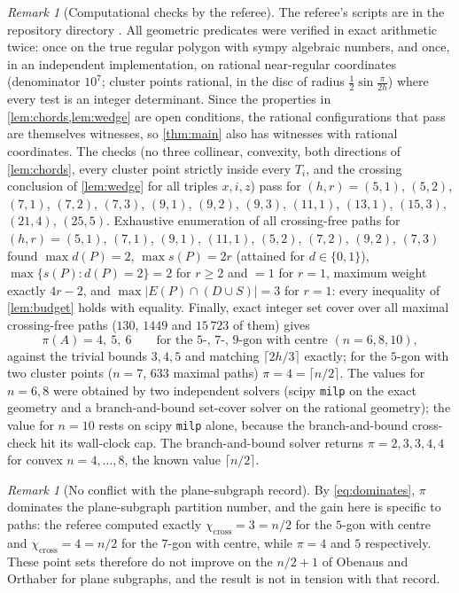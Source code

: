 \documentclass[11pt,a4paper]{article}
\theoremstyle{plain}
\theoremstyle{definition}
\theoremstyle{remark}
\newtheorem{remark}[theorem]{Remark}
\newcommand{\pipath}{\pi}
\newcommand{\chicross}{\chi_{\mathrm{cross}}}
\newcommand{\dP}{d}
\newcommand{\sP}{s}
\begin{document}
\begin{remark}[Computational checks by the referee]\label{rem:comp}
The referee's scripts are in the repository directory . All geometric predicates were verified in exact arithmetic twice: once on the true regular polygon with sympy algebraic numbers, and once, in an independent implementation, on rational near-regular coordinates (denominator $10^7$; cluster points rational, in the disc of radius $\tfrac12\sin\frac{\pi}{2h}$) where every test is an integer determinant. Since the properties in \cref{lem:chords,lem:wedge} are open conditions, the rational configurations that pass are themselves witnesses, so \cref{thm:main} also has witnesses with rational coordinates. The checks (no three collinear, convexity, both directions of \cref{lem:chords}, every cluster point strictly inside every $T_i$, and the crossing conclusion of \cref{lem:wedge} for all triples $x,i,z$) pass for $(h,r)=(5,1)$, $(5,2)$, $(7,1)$, $(7,2)$, $(7,3)$, $(9,1)$, $(9,2)$, $(9,3)$, $(11,1)$, $(13,1)$, $(15,3)$, $(21,4)$, $(25,5)$. Exhaustive enumeration of all crossing-free paths for $(h,r)=(5,1)$, $(7,1)$, $(9,1)$, $(11,1)$, $(5,2)$, $(7,2)$, $(9,2)$, $(7,3)$ found $\max\dP(P)=2$, $\max\sP(P)=2r$ (attained for $\dP\in\{0,1\}$), $\max\{\sP(P):\dP(P)=2\}=2$ for $r\ge2$ and $=1$ for $r=1$, maximum weight exactly $4r-2$, and $\max|E(P)\cap(D\cup S)|=3$ for $r=1$: every inequality of \cref{lem:budget} holds with equality. Finally, exact integer set cover over all maximal crossing-free paths ($130$, $1449$ and $15\,723$ of them) gives
\[
 \pipath(A)=4,\ 5,\ 6\qquad\text{for the }5\text{-, }7\text{-, }9\text{-gon with centre }(n=6,8,10),
\]
against the trivial bounds $3,4,5$ and matching $\lceil2h/3\rceil$ exactly; for the $5$-gon with two cluster points ($n=7$, $633$ maximal paths) $\pipath=4=\lceil n/2\rceil$. The values for $n=6,8$ were obtained by two independent solvers (scipy \texttt{milp} on the exact geometry and a branch-and-bound set-cover solver on the rational geometry); the value for $n=10$ rests on scipy \texttt{milp} alone, because the branch-and-bound cross-check hit its wall-clock cap. The branch-and-bound solver returns $\pipath=2,3,3,4,4$ for convex $n=4,\dots,8$, the known value $\lceil n/2\rceil$.
\end{remark}

\begin{remark}[No conflict with the plane-subgraph record]\label{rem:subgraphs}
By \eqref{eq:dominates}, $\pipath$ dominates the plane-subgraph partition number, and the gain here is specific to paths: the referee computed exactly $\chicross=3=n/2$ for the $5$-gon with centre and $\chicross=4=n/2$ for the $7$-gon with centre, while $\pipath=4$ and $5$ respectively. These point sets therefore do not improve on the $n/2+1$ of Obenaus and Orthaber \cite{OO21} for plane subgraphs, and the result is not in tension with that record.
\end{remark}
\end{document}

